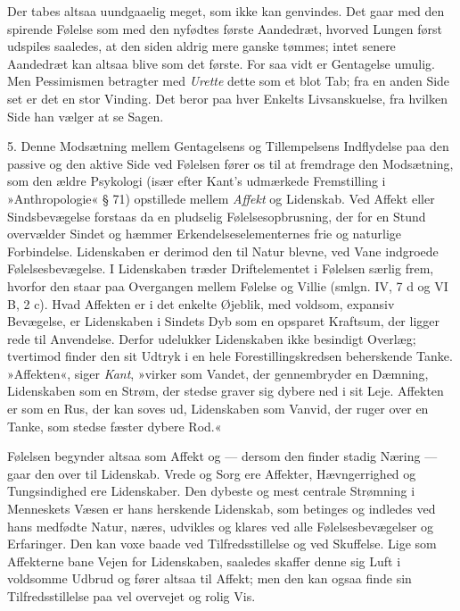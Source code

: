 \documentclass[12pt,a4paper,openany]{book}
\newcommand{\opage}[1]{\marginnote{\footnotesize\textit{[#1]}}}
\begin{document}
Der tabes altsaa uundgaaelig meget, som ikke kan genvindes. Det gaar med
den spirende Følelse som med den nyfødtes første Aandedræt, hvorved
Lungen først udspiles saaledes, at den siden aldrig mere ganske tømmes;
intet senere Aandedræt kan altsaa blive som det første. For saa vidt er
Gentagelse umulig. Men Pessimismen betragter med \emph{Urette} dette som
et blot Tab; fra en anden Side set er det en stor
\opage{334}Vinding. Det beror paa hver Enkelts Livsanskuelse, fra
hvilken Side han vælger at se Sagen.

5. Denne Modsætning mellem Gentagelsens og Tillempelsens Indflydelse paa
den passive og den aktive Side ved Følelsen fører os til at fremdrage
den Modsætning, som den ældre Psykologi (især efter Kant’s udmærkede
Fremstilling i »Anthropologie« § 71) opstillede mellem \emph{Affekt} og
Lidenskab. Ved Affekt eller Sindsbevægelse forstaas da en pludselig
Følelsesopbrusning, der for en Stund overvælder Sindet og hæmmer
Erkendelseselementernes frie og naturlige Forbindelse. Lidenskaben er
derimod den til Natur blevne, ved Vane indgroede Følelsesbevægelse. I
Lidenskaben træder Driftelementet i Følelsen særlig frem, hvorfor den
staar paa Overgangen mellem Følelse og Villie (smlgn. IV, 7 d og VI B, 2
c). Hvad Affekten er i det enkelte Øjeblik, med voldsom, expansiv
Bevægelse, er Lidenskaben i Sindets Dyb som en opsparet Kraftsum, der
ligger rede til Anvendelse. Derfor udelukker Lidenskaben ikke besindigt
Overlæg; tvertimod finder den sit Udtryk i en hele Forestillingskredsen
beherskende Tanke. »Affekten«, siger \emph{Kant}, »virker som Vandet,
der gennembryder en Dæmning, Lidenskaben som en Strøm, der stedse graver
sig dybere ned i sit Leje. Affekten er som en Rus, der kan soves ud,
Lidenskaben som Vanvid, der ruger over en Tanke, som stedse fæster
dybere Rod.«

Følelsen begynder altsaa som Affekt og --- dersom den finder stadig
Næring --- gaar den over til Lidenskab. Vrede og Sorg ere Affekter,
Hævngerrighed og Tungsindighed ere Lidenskaber. Den dybeste og mest
centrale Strømning i Menneskets Væsen er hans herskende Lidenskab, som
betinges og indledes ved hans medfødte Natur, næres, udvikles og klares
ved alle Følelsesbevægelser og Erfaringer. Den kan voxe baade ved
Tilfredsstillelse og ved Skuffelse. Lige som Affekterne bane Vejen for
Lidenskaben, saaledes skaffer denne sig Luft i voldsomme Udbrud og fører
altsaa til Affekt; men den kan ogsaa finde sin Tilfredsstillelse paa vel
overvejet og rolig Vis.
\end{document}
